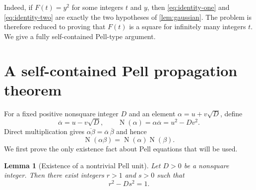\documentclass[11pt]{article}
\newtheorem{lemma}[lemma]{Lemma}
\theoremstyle{remark}
\newcommand{\Norm}{\operatorname{N}}
\begin{document}
Indeed, if $F(t)=y^2$ for some integers $t$ and $y$, then \eqref{eq:identity-one} and \eqref{eq:identity-two} are exactly the two hypotheses of \cref{lem:gaussian}.  The problem is therefore reduced to proving that $F(t)$ is a square for infinitely many integers $t$.  We give a fully self-contained Pell-type argument.

\section{A self-contained Pell propagation theorem}

For a fixed positive nonsquare integer $D$ and an element $\alpha=u+v\sqrt D$, define
\[
 \overline\alpha=u-v\sqrt D,
 \qquad
 \Norm(\alpha)=\alpha\overline\alpha=u^2-Dv^2.
\]
Direct multiplication gives $\overline{\alpha\beta}=\overline\alpha\,\overline\beta$ and hence
\begin{equation}\label{eq:norm-multiplicative}
 \Norm(\alpha\beta)=\Norm(\alpha)\Norm(\beta).
\end{equation}
We first prove the only existence fact about Pell equations that will be used.

\begin{lemma}[Existence of a nontrivial Pell unit]\label{lem:pell-existence}
Let $D>0$ be a nonsquare integer.  Then there exist integers $r>1$ and $s>0$ such that
\begin{equation}\label{eq:pell-basic}
 r^2-Ds^2=1.
\end{equation}
\end{lemma}
\end{document}
